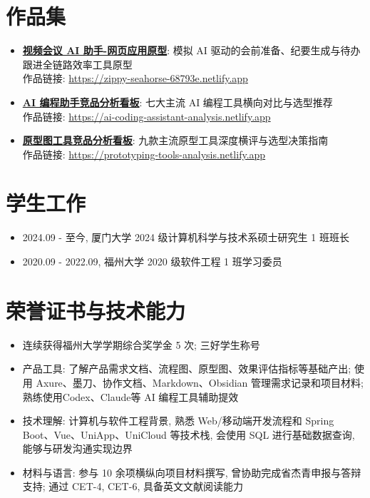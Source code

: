 \documentclass{resume}
\begin{document}
\section{作品集}
\begin{itemize}[parsep=0em, topsep=0.16em, itemsep=0em]
  \item \href{https://zippy-seahorse-68793e.netlify.app}{\textbf{视频会议 AI 助手-网页应用原型}}: 模拟 AI 驱动的会前准备、纪要生成与待办跟进全链路效率工具原型\\[-0.05ex]
  作品链接: \href{https://zippy-seahorse-68793e.netlify.app}{https://zippy-seahorse-68793e.netlify.app}
  \item \href{https://ai-coding-assistant-analysis.netlify.app}{\textbf{AI 编程助手竞品分析看板}}: 七大主流 AI 编程工具横向对比与选型推荐\\[-0.05ex]
  作品链接: \href{https://ai-coding-assistant-analysis.netlify.app}{https://ai-coding-assistant-analysis.netlify.app}
  \item \href{https://prototyping-tools-analysis.netlify.app}{\textbf{原型图工具竞品分析看板}}: 九款主流原型工具深度横评与选型决策指南\\[-0.05ex]
  作品链接: \href{https://prototyping-tools-analysis.netlify.app}{https://prototyping-tools-analysis.netlify.app}
\end{itemize}

\section{学生工作}
\begin{itemize}[parsep=0.2ex]
  \item 2024.09 - 至今, 厦门大学 2024 级计算机科学与技术系硕士研究生 1 班班长
  \item 2020.09 - 2022.09, 福州大学 2020 级软件工程 1 班学习委员
\end{itemize}

\section{荣誉证书与技术能力}
\begin{itemize}[parsep=0.2ex]
  \item 连续获得福州大学学期综合奖学金 5 次; 三好学生称号
  \item 产品工具: 了解产品需求文档、流程图、原型图、效果评估指标等基础产出; 使用 Axure、墨刀、协作文档、Markdown、Obsidian 管理需求记录和项目材料; 熟练使用Codex、Claude等 AI 编程工具辅助提效
  \item 技术理解: 计算机与软件工程背景, 熟悉 Web/移动端开发流程和 Spring Boot、Vue、UniApp、UniCloud 等技术栈, 会使用 SQL 进行基础数据查询, 能够与研发沟通实现边界
  \item 材料与语言: 参与 10 余项横纵向项目材料撰写, 曾协助完成省杰青申报与答辩支持; 通过 CET-4, CET-6, 具备英文文献阅读能力
\end{itemize}

\end{document}
